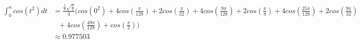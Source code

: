 \documentclass[9pt]{article}
\begin{document}
\begin{align*}
  \int_0^a cos(t^2) dt &= \frac{\frac{1}{8} \sqrt{\frac{\pi}{2}}}{3} (cos(0^2) + 4cos(\frac{\pi}{128}) + 2cos(\frac{\pi}{32}) + 4cos(\frac{9\pi}{128}) + 2cos(\frac{\pi}{8}) + 4cos(\frac{25\pi}{128}) + 2cos(\frac{9\pi}{32}) \\
  & \ \ \ + 4cos(\frac{49\pi}{128}) + cos(\frac{\pi}{2})) \\
  &\approx 0.977503
\end{align*}
\end{document}
